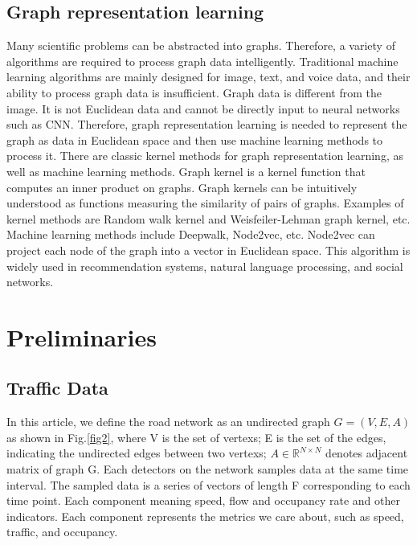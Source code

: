 \documentclass[conference]{IEEEtran}
\begin{document}
\subsection{Graph representation learning}
Many scientific problems can be abstracted into graphs. Therefore, a variety of algorithms are required to process graph data intelligently. Traditional machine learning algorithms are mainly designed for image, text, and voice data, and their ability to process graph data is insufficient. Graph data is different from the image. It is not Euclidean data and cannot be directly input to neural networks such as CNN. Therefore, graph representation learning is needed to represent the graph as data in Euclidean space and then use machine learning methods to process it. There are classic kernel methods for graph representation learning, as well as machine learning methods. Graph kernel is a kernel function that computes an inner product on graphs. Graph kernels can be intuitively understood as functions measuring the similarity of pairs of graphs. Examples of kernel methods are Random walk kernel and Weisfeiler-Lehman graph kernel, etc. Machine learning methods include Deepwalk, Node2vec, etc. Node2vec can project each node of the graph into a vector in Euclidean space. This algorithm is widely used in recommendation systems, natural language processing, and social networks.

\section{Preliminaries}
\subsection{Traffic Data}
In this article, we define the road network as an undirected graph 
\begin{math}
    G = (V,E,A)     
\end{math} as shown in Fig.\ref{fig2}, where V is the set of vertexs; E is the set of the edges, indicating the undirected edges between two vertexs; \begin{math} A \in  \mathbb{R}^{N\times N} \end{math} denotes adjacent matrix of graph G. Each detectors on the network samples data at the same time interval. The sampled data is a series of vectors of length F corresponding to each time point. Each component meaning speed, flow and occupancy rate and other indicators. Each component represents the metrics we care about, such as speed, traffic, and occupancy.
\end{document}
